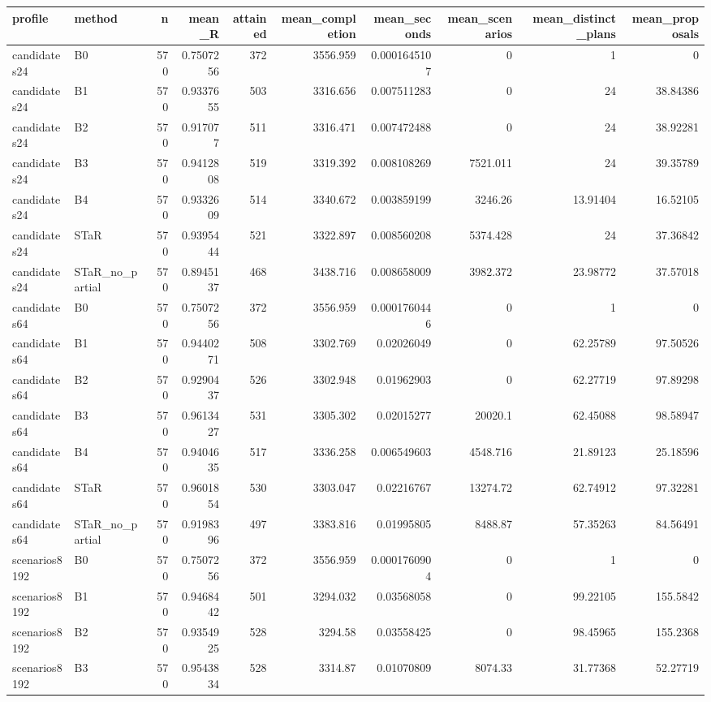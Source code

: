 \begin{tabular}{llrrrrrrrr}
\hline
profile & method & n & mean\_R & attained & mean\_completion & mean\_seconds & mean\_scenarios & mean\_distinct\_plans & mean\_proposals \\
\hline
candidates24 & B0 & 570 & 0.7507256 & 372 & 3556.959 & 0.0001645107 & 0 & 1 & 0 \\
candidates24 & B1 & 570 & 0.9337655 & 503 & 3316.656 & 0.007511283 & 0 & 24 & 38.84386 \\
candidates24 & B2 & 570 & 0.917077 & 511 & 3316.471 & 0.007472488 & 0 & 24 & 38.92281 \\
candidates24 & B3 & 570 & 0.9412808 & 519 & 3319.392 & 0.008108269 & 7521.011 & 24 & 39.35789 \\
candidates24 & B4 & 570 & 0.9332609 & 514 & 3340.672 & 0.003859199 & 3246.26 & 13.91404 & 16.52105 \\
candidates24 & STaR & 570 & 0.9395444 & 521 & 3322.897 & 0.008560208 & 5374.428 & 24 & 37.36842 \\
candidates24 & STaR\_no\_partial & 570 & 0.8945137 & 468 & 3438.716 & 0.008658009 & 3982.372 & 23.98772 & 37.57018 \\
candidates64 & B0 & 570 & 0.7507256 & 372 & 3556.959 & 0.0001760446 & 0 & 1 & 0 \\
candidates64 & B1 & 570 & 0.9440271 & 508 & 3302.769 & 0.02026049 & 0 & 62.25789 & 97.50526 \\
candidates64 & B2 & 570 & 0.9290437 & 526 & 3302.948 & 0.01962903 & 0 & 62.27719 & 97.89298 \\
candidates64 & B3 & 570 & 0.9613427 & 531 & 3305.302 & 0.02015277 & 20020.1 & 62.45088 & 98.58947 \\
candidates64 & B4 & 570 & 0.9404635 & 517 & 3336.258 & 0.006549603 & 4548.716 & 21.89123 & 25.18596 \\
candidates64 & STaR & 570 & 0.9601854 & 530 & 3303.047 & 0.02216767 & 13274.72 & 62.74912 & 97.32281 \\
candidates64 & STaR\_no\_partial & 570 & 0.9198396 & 497 & 3383.816 & 0.01995805 & 8488.87 & 57.35263 & 84.56491 \\
scenarios8192 & B0 & 570 & 0.7507256 & 372 & 3556.959 & 0.0001760904 & 0 & 1 & 0 \\
scenarios8192 & B1 & 570 & 0.9468442 & 501 & 3294.032 & 0.03568058 & 0 & 99.22105 & 155.5842 \\
scenarios8192 & B2 & 570 & 0.9354925 & 528 & 3294.58 & 0.03558425 & 0 & 98.45965 & 155.2368 \\
scenarios8192 & B3 & 570 & 0.9543834 & 528 & 3314.87 & 0.01070809 & 8074.33 & 31.77368 & 52.27719 \\

\end{tabular}
